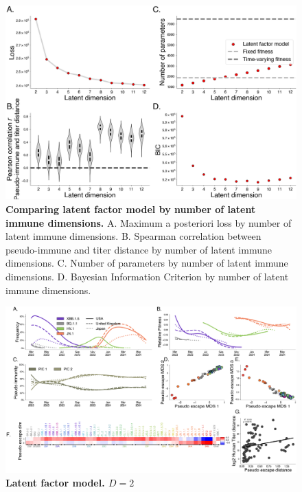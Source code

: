 \documentclass[11pt,oneside,letterpaper]{article}
\begin{document}
\begin{figure}[t!]
    \centering
    \includegraphics[width=1.0\textwidth=0.01]{./supplementary_figures/loss_by_latent_dimension.png}
    \caption{
      \textbf{Comparing latent factor model by number of latent immune dimensions.}
      A. Maximum a posteriori loss by number of latent immune dimensions.
      B. Spearman correlation between pseudo-immune and titer distance by number of latent immune dimensions.
      C. Number of parameters by number of latent immune dimensions.
      D. Bayesian Information Criterion by number of latent immune dimensions.
    }
    \label{fig:latent_factor_dimension}
\end{figure}

\begin{figure}[t!]
    \centering
    \includegraphics[width=1.0\textwidth=0.01]{./supplementary_figures/latent_immune_2_dims.png}
    \caption{
      \textbf{Latent factor model. $D=2$}
    }
    \label{fig:latent_factor_2}
\end{figure}
\end{document}
